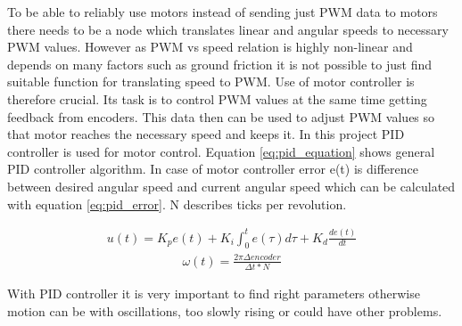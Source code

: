 To be able to reliably use motors instead of sending just PWM data to motors there needs to be a node which translates linear and angular speeds to necessary PWM values. However as PWM vs speed relation is highly non-linear and depends on many factors such as ground friction it is not possible to just find suitable function for translating speed to PWM. Use of motor controller is therefore crucial. Its task is to control PWM values at the same time getting feedback from encoders. This data then can be used to adjust PWM values so that motor reaches the necessary speed and keeps it. In this project PID controller is used for motor control. Equation \ref{eq:pid_equation} shows general PID controller algorithm. In case of motor controller error e(t) is difference between desired angular speed and current angular speed which can be calculated with equation \ref{eq:pid_error}. N describes ticks per revolution.

\begin{align}
\label{eq:pid_equation}
u(t) = K_p e(t) + K_i \int_{0}^{t} e(\tau) d\tau + K_d \frac{de(t)}{dt} 
\end{align}
\begin{align}
\label{eq:pid_error}
\omega (t) = \frac{2 \pi \Delta encoder}{\Delta t * N}
\end{align}

With PID controller it is very important to find right parameters otherwise motion can be with oscillations, too slowly rising or could have other problems. 
